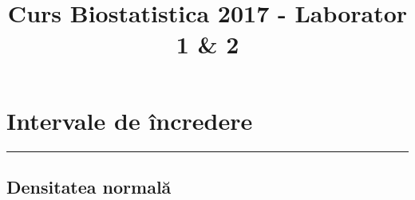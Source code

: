\documentclass[]{article}
\title{Curs Biostatistica 2017 - Laborator 1 \& 2}
\author{}
\date{}
\begin{document}
\maketitle

{
\setcounter{tocdepth}{2}
\tableofcontents
}
\section{Intervale de încredere}\label{intervale-de-incredere}

\begin{center}\rule{0.5\linewidth}{\linethickness}\end{center}

\subsection{Densitatea normală}\label{densitatea-normala}
\end{document}
